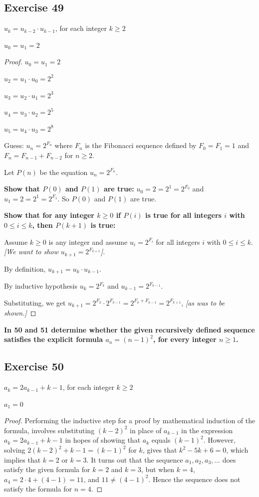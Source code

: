 \documentclass[14pt]{extarticle}
\newcommand{\cy}{\color{cyan}}
\begin{document}
\subsection{Exercise 49}
\(u_k = u_{k-2} \cdot u_{k-1}\), for each integer \(k \geq 2\)

\(u_0 = u_1 = 2\)

\begin{proof}
\(u_0 = u_1 = 2\)

\(u_2 = u_1 \cdot u_0 = 2^2\)

\(u_3 = u_2 \cdot u_1 = 2^3\)

\(u_4 = u_3 \cdot u_2 = 2^5\)

\(u_5 = u_4 \cdot u_3 = 2^8\)

Guess: \(u_n = 2^{F_n}\) where $F_n$ is the Fibonacci sequence defined by \(F_0 = F_1 = 1\) and 
\(F_n = F_{n-1} + F_{n-2}\) for \(n \geq 2\).

Let $P(n)$ be the equation \(u_n = 2^{F_n}\).

{\bf Show that $P(0)$ and $P(1)$ are true:} \(u_0 = 2 = 2^1 = 2^{F_0}\) and \(u_1 = 2 = 2^1 = 2^{F_1}\).
So $P(0)$ and $P(1)$ are true.

{\bf Show that for any integer \(k \geq 0\) if $P(i)$ is true for all integers $i$ with \(0 \leq i \leq k\), then
$P(k+1)$ is true:}

Assume \(k \geq 0\) is any integer and assume \(u_i = 2^{F_i}\) for all integers $i$ with \(0 \leq i \leq k\).
{\it [We want to show \(u_{k+1} = 2^{F_{k+1}}\)].}

By definition, \(u_{k+1} = u_k \cdot u_{k-1}\).

By inductive hypothesis \(u_k = 2^{F_k}\) and \(u_{k-1} = 2^{F_{k-1}}\).

Substituting, we get \(u_{k+1} = 2^{F_k} \cdot 2^{F_{k-1}} = 2^{F_k + F_{k-1}} = 2^{F_{k+1}}\),
{\it [as was to be shown.]}
\end{proof}

{\bf \cy In 50 and 51 determine whether the given recursively defined sequence satisfies the explicit formula \(a_n = (n - 1)^2\), for every integer \(n \geq 1\).}

\subsection{Exercise 50}
\(a_k = 2a_{k-1} + k-1\), for each integer \(k \geq 2\)

\(a_1 = 0\)

\begin{proof}
Performing the inductive step for a proof by mathematical induction of the formula, involves substituting 
\((k - 2)^2\) in place of \(a_{k-1}\) in the expression \(a_k = 2a_{k-1} + k - 1\) in hopes of showing that $a_k$
equals \((k - 1)^2\). However, solving \(2(k - 2)^2 + k - 1 = (k - 1)^2\) for $k$, gives that \(k^2 - 5k + 6 = 0\), 
which implies that \(k = 2\) or \(k = 3\). It turns out that the sequence \(a_1, a_2, a_3, \ldots\) does satisfy 
the given formula for \(k = 2\) and \(k = 3\), but when \(k = 4\), \(a_4 = 2 \cdot 4 + (4 - 1) = 11\), and 
\(11 \neq (4 - 1)^2\). Hence the sequence does not satisfy the formula for $n = 4$.
\end{proof}
\end{document}
